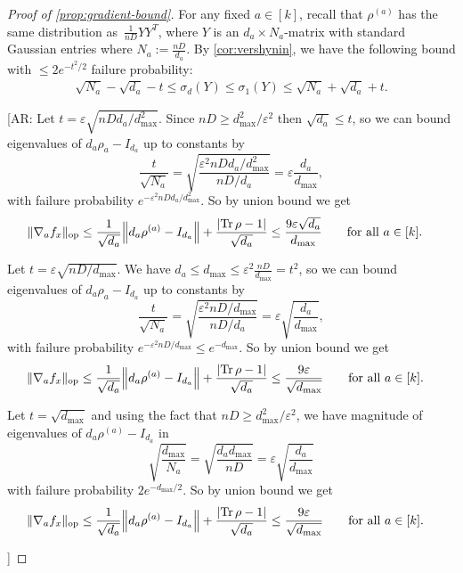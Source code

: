 \documentclass[aos]{imsart}
\theoremstyle{definition}
\numberwithin{equation}{section}
\DeclareMathOperator{\op}{op}
\DeclareMathOperator{\tr}{Tr}
\DeclarePairedDelimiter{\abs}{\lvert}{\rvert}
\DeclarePairedDelimiter{\norm}{\lVert}{\rVert}
\newcommand{\eps}{\varepsilon}
\newcommand{\AR}[1]{{\color{orange}[AR: #1]}}
\begin{document}
\begin{proof}[Proof of \cref{prop:gradient-bound}]
For any fixed $a\in[k]$, recall that $\rho^{(a)}$ has the same distribution as~$\frac1{nD} YY^T$, where $Y$ is an $d_a\times N_a$-matrix with standard Gaussian entries where $N_{a} := \frac{nD}{d_{a}}$.
By \cref{cor:vershynin}, we have the following bound with $\leq 2 e^{-t^2/2}$ failure probability:
\begin{align*}
  \sqrt{N_a} - \sqrt{d_a} - t \leq \sigma_d(Y) \leq \sigma_1(Y) \leq \sqrt{N_a} + \sqrt{d_a} + t.
\end{align*}
\AR{
Let $t = \eps \sqrt{n D d_{a}/ d_{\max}^{2}}$. Since $nD \geq d_{\max}^{2}/\eps^{2}$ then $\sqrt{d_{a}} \leq t$, so we can bound eigenvalues of $d_{a} \rho_{a} - I_{d_{a}}$ up to constants by 
\[ \frac{t}{\sqrt{N_{a}}} =  \sqrt{ \frac{\eps^{2} nD d_{a}/ d_{\max}^{2}}{nD / d_{a}} }
= \eps \frac{d_{a}}{d_{\max}} , \]
with failure probability $e^{-\eps^{2} n D d_{a}/ d_{\max}^{2}}$. 
So by union bound we get
\begin{align*}
  \norm{\nabla_a f_x}_{\op}
&\leq\frac{1}{\sqrt{d_a}} \norm*{d_{a} \rho^{(a)} - I_{d_a}} + \frac{\abs{\tr\rho - 1}}{\sqrt{d_a}}
\leq \frac{9\eps \sqrt{d_{a}} }{d_{\max}} \qquad \text{for all } a\in[k].
\end{align*}


Let $t = \eps \sqrt{n D / d_{\max}}$. We have $d_{a} \leq d_{\max} \leq \eps^{2} \frac{n D}{d_{\max}} = t^{2}$, so we can bound eigenvalues of $d_{a} \rho_{a} - I_{d_{a}}$ up to constants by 
\[ \frac{t}{\sqrt{N_{a}}} =  \sqrt{ \frac{\eps^{2} nD / d_{\max}}{nD / d_{a}} }
= \eps \sqrt{ \frac{d_{a}}{d_{\max}} } , \]
with failure probability $e^{-\eps^{2} n D / d_{\max}} \leq e^{-d_{\max}}$. 
So by union bound we get
\begin{align*}
  \norm{\nabla_a f_x}_{\op}
&\leq\frac{1}{\sqrt{d_a}} \norm*{d_{a} \rho^{(a)} - I_{d_a}} + \frac{\abs{\tr\rho - 1}}{\sqrt{d_a}}
\leq \frac{9\eps }{\sqrt{d_{\max}}} \qquad \text{for all } a\in[k].
\end{align*}


Let $t = \sqrt{d_{\max}}$ and using the fact that $n D \geq d_{\max}^{2} / \eps^{2}$, we have magnitude of eigenvalues of $d_{a} \rho^{(a)} - I_{d_{a}}$  in
\[ \sqrt{\frac{d_{\max}}{N_{a}}} = \sqrt{\frac{d_{a} d_{\max}}{nD}} = \eps \sqrt{\frac{d_{a}}{d_{\max}}}  \]
with failure probability $2 e^{-d_{\max}/2}$. So by union bound we get
\begin{align*}
  \norm{\nabla_a f_x}_{\op}
&\leq\frac{1}{\sqrt{d_a}} \norm*{d_{a} \rho^{(a)} - I_{d_a}} + \frac{\abs{\tr\rho - 1}}{\sqrt{d_a}}
\leq \frac{9\eps }{\sqrt{d_{\max}}} \qquad \text{for all } a\in[k].
\end{align*}

}
\end{proof}
\end{document}
